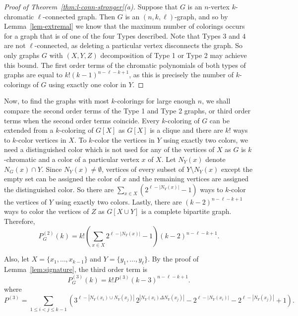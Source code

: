 \documentclass[11pt]{article}
\theoremstyle{plain}
\theoremstyle{definition}
\theoremstyle{remark}
\begin{document}
\begin{proof}[Proof of Theorem~\ref{thm:l-conn-stronger}(a)]
Suppose that $G$ is an $n$-vertex $k$-chromatic $\ell$-connected graph.  Then $G$ is an $(n,k,\ell)$-graph, and so by Lemma~\ref{lem-extremal} we know that the maximum number of colorings occurs for a graph that is of one of the four Types described.  Note that Types $3$ and $4$ are not $\ell$-connected, as deleting a particular vertex disconnects the graph.  So  only graphs $G$ with $(X,Y,Z)$ decomposition of Type 1 or Type 2 may achieve this bound. The first order terms of the chromatic polynomials of both types of graphs are equal to $k!(k-1)^{n-\ell-k+1}$, as this is precisely the number of $k$-colorings of $G$ using exactly one color in $Y$.
\end{proof}

Now, to find the graphs with most $k$-colorings for large enough $n$, we shall compare the second order terms of the Type 1 and Type 2 graphs, or third order terms when the second order terms coincide. Every $k$-coloring of $G$ can be extended from a $k$-coloring of $G[X]$ as $G[X]$ is a clique and  there are $k!$ ways to $k$-color vertices in $X$.  To $k$-color the vertices in $Y$ using exactly two colors, we need a distinguished color which is not used for any of the vertices of $X$ as $G$ is $k$-chromatic and a color of a particular vertex $x$ of $X$. Let $N_Y(x)$ denote $N_G(x)\cap Y$. Since $N_Y(x)\neq \emptyset$, vertices of every subset of $Y\setminus N_Y(x)$ except the empty set  can be assigned the color of $x$ and the remaining vertices are assigned the distinguished color. So there are $\sum_{x \in X} \left( 2^{\ell-|N_Y(x)|} - 1 \right)$ ways to $k$-color the vertices of $Y$ using exactly two colors. Lastly, there are $(k-2)^{n-\ell-k+1}$ ways to color the vertices of $Z$ as $G[X\cup Y]$ is a complete bipartite graph. Therefore, 
\begin{equation}\label{2nd_ord_form}
  P_G^{(2)}(k) = k! \left(\sum_{x \in X} 2^{\ell-|N_Y(x)|} - 1 \right)(k-2)^{n-\ell-k+1}.  
\end{equation}

Also, let $X=\{x_1 ,\dots , x_{k-1}\}$ and $Y=\{y_1 ,\dots , y_{\ell}\}$. By the proof of Lemma~\ref{lem:signature}, the third order term is
\[P_G^{(3)}(k)=k! P^{(3)} (k-3)^{n-\ell -k+1}.\] where
\begin{equation}\label{3rd_ord_form}
  P^{(3)}=  \sum _{1\leq i < j\leq k-1}\left(3^{\ell - |N_Y(x_i)\cup N_Y(x_j)|}\,2^{|N_Y(x_i)\Delta N_Y(x_j)|}-2^{\ell-|N_Y(x_i)|}-2^{\ell-|N_Y(x_j)|}+1\right).
\end{equation}
\end{document}

